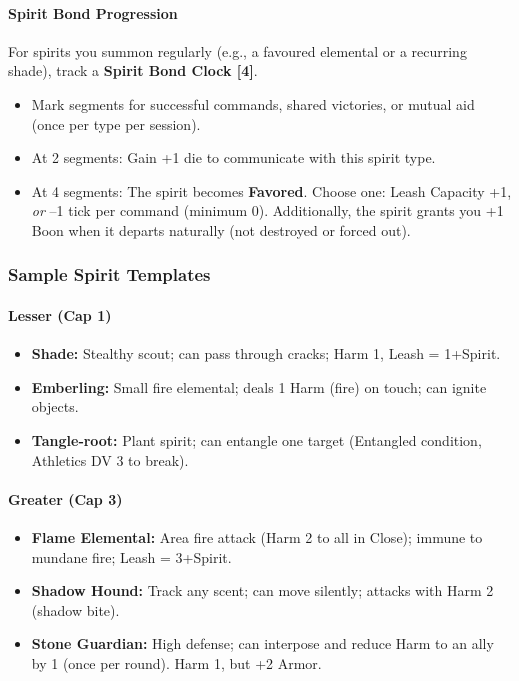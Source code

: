 \paragraph{Spirit Bond Progression}
For spirits you summon regularly (e.g., a favoured elemental or a recurring shade), track a \textbf{Spirit Bond Clock [4]}.
\begin{itemize}
  \item Mark segments for successful commands, shared victories, or mutual aid (once per type per session).
  \item At 2 segments: Gain +1 die to communicate with this spirit type.
  \item At 4 segments: The spirit becomes \textbf{Favored}. Choose one: Leash Capacity +1, \emph{or} –1 tick per command (minimum 0). Additionally, the spirit grants you +1 Boon when it departs naturally (not destroyed or forced out).
\end{itemize}

\subsubsection{Sample Spirit Templates}

\paragraph{Lesser (Cap 1)}
\begin{itemize}
  \item \textbf{Shade:} Stealthy scout; can pass through cracks; Harm 1, Leash = 1+Spirit.
  \item \textbf{Emberling:} Small fire elemental; deals 1 Harm (fire) on touch; can ignite objects.
  \item \textbf{Tangle‑root:} Plant spirit; can entangle one target (Entangled condition, Athletics DV 3 to break).
\end{itemize}

\paragraph{Greater (Cap 3)}
\begin{itemize}
  \item \textbf{Flame Elemental:} Area fire attack (Harm 2 to all in Close); immune to mundane fire; Leash = 3+Spirit.
  \item \textbf{Shadow Hound:} Track any scent; can move silently; attacks with Harm 2 (shadow bite).
  \item \textbf{Stone Guardian:} High defense; can interpose and reduce Harm to an ally by 1 (once per round). Harm 1, but +2 Armor.
\end{itemize}

